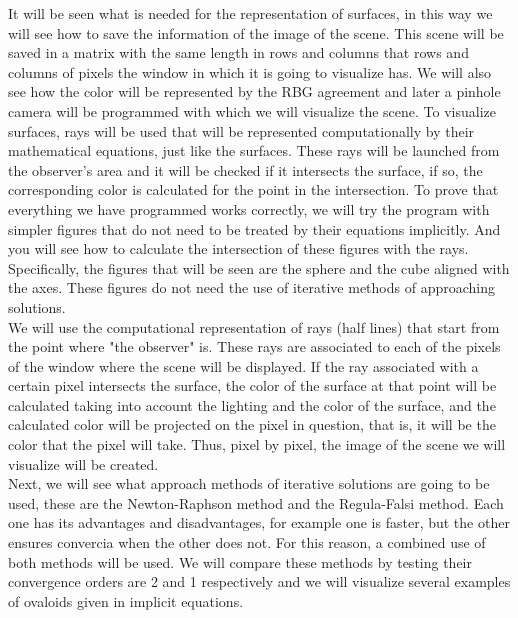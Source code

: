 It will be seen what is needed for the representation of surfaces, in this way we will see how to save the information of the image of the scene. This scene will be saved in a matrix with the same length in rows and columns that rows and columns of pixels the window in which it is going to visualize has. We will also see how the color will be represented by the RBG agreement and later a pinhole camera will be programmed with which we will visualize the scene. To visualize surfaces, rays will be used that will be represented computationally by their mathematical equations, just like the surfaces. These rays will be launched from the observer's area and it will be checked if it intersects the surface, if so, the corresponding color is calculated for the point in the intersection. To prove that everything we have programmed works correctly, we will try the program with simpler figures that do not need to be treated by their equations implicitly. And you will see how to calculate the intersection of these figures with the rays. Specifically, the figures that will be seen are the sphere and the cube aligned with the axes. These figures do not need the use of iterative methods of approaching solutions.
${ }$\\

We will use the computational representation of rays (half lines) that start from the point where "the observer" is. These rays are associated to each of the pixels of the window where the scene will be displayed. If the ray associated with a certain pixel intersects the surface, the color of the surface at that point will be calculated taking into account the lighting and the color of the surface, and the calculated color will be projected on the pixel in question, that is, it will be the color that the pixel will take. Thus, pixel by pixel, the image of the scene we will visualize will be created.
${ }$\\

Next, we will see what approach methods of iterative solutions are going to be used, these are the Newton-Raphson method and the Regula-Falsi method. Each one has its advantages and disadvantages, for example one is faster, but the other ensures convercia when the other does not. For this reason, a combined use of both methods will be used. We will compare these methods by testing their convergence orders are 2 and 1 respectively and we will visualize several examples of ovaloids given in implicit equations.
${ }$\\

